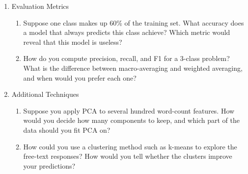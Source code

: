 \documentclass[12pt]{article}
\begin{document}
\begin{enumerate}
\item Evaluation Metrics

\begin{enumerate}

\item Suppose one class makes up 60\% of the training set. What accuracy does a model
  that always predicts this class achieve? Which metric would reveal that this model is
  useless?

\item How do you compute precision, recall, and F1 for a 3-class problem? What is the
  difference between macro-averaging and weighted averaging, and when would you prefer
  each one?

\end{enumerate}

\item Additional Techniques

\begin{enumerate}

\item Suppose you apply PCA to several hundred word-count features. How would you decide
  how many components to keep, and which part of the data should you fit PCA on?

\item How could you use a clustering method such as k-means to explore the free-text
  responses? How would you tell whether the clusters improve your predictions?

\end{enumerate}

\end{enumerate}
\end{document}
